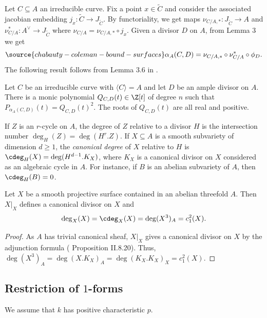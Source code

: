 Let $C\subseteq A$ an irreducible curve. Fix a point $x\in \widetilde{C}$ and consider the associated jacobian embedding $j_x:\widetilde{C}\to J_{\widetilde{C}}$. By functoriality, we get maps $\nu_{C/A,*} : J_{\widetilde{C}}\to A$ and $\nu_{C/A}^* : A^\vee \to J_{\widetilde{C}}$ where $\nu_{C/A} = \nu_{C/A,*}\circ j_x$. Given a divisor $D$ on $A$, from \cite{Matsusaka} Lemma 3 we get
\begin{equation}\label{EqnDefAlpha}
\source{chabauty-coleman-bound-surfaces}
\alpha_A(C,D) = \nu_{C/A,*}\circ \nu_{C/A}^*\circ \phi_D.
\end{equation}
The following result follows from Lemma 3.6 in \cite{Debarre}.
\begin{lemma}
\notready\label{LemmaSquare} Let $C$ be an irreducible curve with $\langle C\rangle =A$ and let $D$ be an ample divisor on $A$. There is a monic polynomial $Q_{C,D}(t)\in \Z[t]$ of degree $n$ such that $P_{\alpha_A(C,D)}(t)=Q_{C,D}(t)^2$. The roots of $Q_{C,D}(t)$ are all real and positive.
\end{lemma}
If $Z$ is an $r$-cycle on $A$, the degree of $Z$ relative to a divisor $H$ is the intersection number $\deg_H (Z)= \deg(H^r.Z)$. If $X\subseteq A$ is a smooth subvariety of dimension $d\ge 1$, the \emph{canonical degree} of $X$ relative to $H$ is $\cdeg_H(X)=\deg(H^{d-1}.K_X)$, where $K_X$ is a canonical divisor on $X$ considered as an algebraic cycle in $A$. For instance, if $B$ is an abelian subvariety of $A$, then $\cdeg_H(B)=0$.


\begin{lemma}
\notready\label{LemmaDegXA} Let $X$ be a smooth projective surface contained in an abelian threefold $A$. Then $X|_X$ defines a canonical divisor on $X$ and
$$
\deg_X(X)=\cdeg_X(X)=\deg(X^3)_A=c_1^2(X).
$$
\end{lemma}
\begin{proof} As $A$ has trivial canonical sheaf, $X|_X$ gives a canonical divisor on $X$ by the adjunction formula (\cite{Hartshorne} Proposition II.8.20). Thus,  $\deg(X^3)_A=\deg(X.K_X)_A=\deg(K_X.K_X)_X=c_1^2(X)$.
\end{proof}

\subsection{Restriction of $1$-forms} We assume that $k$ has positive characteristic $p$.


